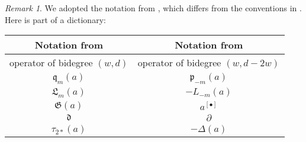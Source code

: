 \documentclass{amsart}
\newcommand{\hilb}[1]{^{[#1]}}
\newcommand{\p}{\mathfrak{p}}
\newcommand{\q}{\mathfrak{q}}
\theoremstyle{plain}
\theoremstyle{definition}
\theoremstyle{remark}
\newtheorem{remark}[theorem]{Remark}
\begin{document}
\begin{remark}
We adopted the notation from \cite{LiQinWang}, which differs from the conventions in \cite{LehnSorger}. Here is part of a dictionary:

\begin{tabular}{c|c} 
Notation from \cite{LiQinWang} & Notation from \cite{LehnSorger} \\\hline
operator of bidegree $(w,d)$ & operator of bidegree $(w,d-2w)$\\
$\q_m(a) $ & $\p_{-m}(a)$ \\
$ \mathfrak{L}_m(a) $ & $ - L_{-m}(a)$ \\
$\mathfrak{G}(a)$ & $a\hilb{\bullet}$\\
$ \mathfrak{d} $ & $ \partial $ \\
$\tau_{2*}(a)$& $-\Delta(a)$
\end{tabular}
\end{remark}
\end{document}
